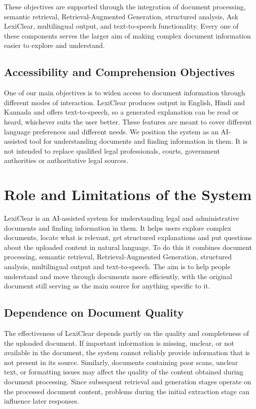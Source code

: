 \documentclass[12pt,a4paper,oneside]{report}
\begin{document}
These objectives are supported through the integration of document
processing, semantic retrieval, Retrieval-Augmented Generation, structured
analysis, Ask LexiClear, multilingual output, and text-to-speech
functionality. Every one of these components serves the larger aim of making complex document information easier to explore and understand.

\subsection{Accessibility and Comprehension Objectives}

One of our main objectives is to widen access to document information through different modes of interaction. LexiClear produces output in English, Hindi and Kannada and offers text-to-speech, so a generated explanation can be read or heard, whichever suits the user better. These features are meant to cover different language preferences and different needs. We position the system as an AI-assisted tool for understanding documents and finding information in them. It is not intended to replace qualified legal professionals, courts, government authorities or authoritative legal sources.

\section{Role and Limitations of the System}

LexiClear is an AI-assisted system for understanding legal and administrative documents and finding information in them. It helps users explore complex documents, locate what is relevant, get structured explanations and put questions about the uploaded content in natural language. To do this it combines document processing, semantic retrieval, Retrieval-Augmented Generation, structured analysis, multilingual output and text-to-speech. The aim is to help people understand and move through documents more efficiently, with the original document still serving as the main source for anything specific to it.

\subsection{Dependence on Document Quality}

The effectiveness of LexiClear depends partly on the quality and completeness
of the uploaded document. If important information is missing, unclear, or
not available in the document, the system cannot reliably provide information
that is not present in its source. Similarly, documents containing poor
scans, unclear text, or formatting issues may affect the quality of the
content obtained during document processing. Since subsequent retrieval and
generation stages operate on the processed document content, problems during
the initial extraction stage can influence later responses.
\end{document}
